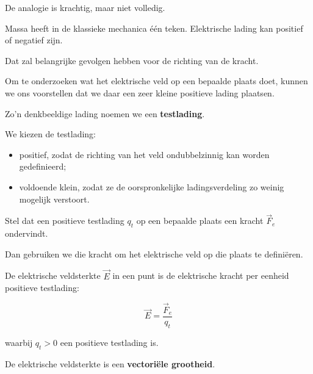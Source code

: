 \documentclass{ximera}
\begin{document}
De analogie is krachtig, maar niet volledig.

Massa heeft in de klassieke mechanica één teken. Elektrische lading
kan positief of negatief zijn.

Dat zal belangrijke gevolgen hebben voor de richting van de kracht.




Om te onderzoeken wat het elektrische veld op een bepaalde plaats
doet, kunnen we ons voorstellen dat we daar een zeer kleine positieve
lading plaatsen.

Zo'n denkbeeldige lading noemen we een \textbf{testlading}.

We kiezen de testlading:

\begin{itemize}
  \item positief, zodat de richting van het veld ondubbelzinnig kan
        worden gedefinieerd;
  \item voldoende klein, zodat ze de oorspronkelijke ladingsverdeling
        zo weinig mogelijk verstoort.
\end{itemize}


Stel dat een positieve testlading $q_t$ op een bepaalde plaats een
kracht $\vec F_e$ ondervindt.

Dan gebruiken we die kracht om het elektrische veld op die plaats te
definiëren.




\begin{definitie}

De elektrische veldsterkte $\vec E$ in een punt is de elektrische
kracht per eenheid positieve testlading:

\[
\boxed{
\vec E
=
\frac{\vec F_e}{q_t}
}
\]

waarbij $q_t>0$ een positieve testlading is.

\end{definitie}


De elektrische veldsterkte is een \textbf{vectoriële grootheid}.
\end{document}
